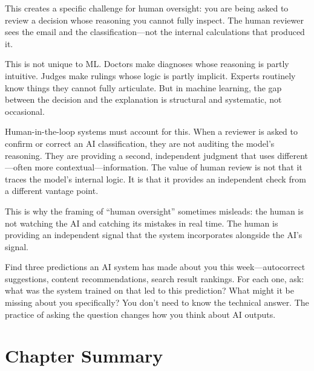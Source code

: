 This creates a specific challenge for human oversight: you are being asked to review a decision whose reasoning you cannot fully inspect. The human reviewer sees the email and the classification---not the internal calculations that produced it.

This is not unique to ML. Doctors make diagnoses whose reasoning is partly intuitive. Judges make rulings whose logic is partly implicit. Experts routinely know things they cannot fully articulate. But in machine learning, the gap between the decision and the explanation is structural and systematic, not occasional.

Human-in-the-loop systems must account for this. When a reviewer is asked to confirm or correct an AI classification, they are not auditing the model's reasoning. They are providing a second, independent judgment that uses different---often more contextual---information. The value of human review is not that it traces the model's internal logic. It is that it provides an independent check from a different vantage point.

This is why the framing of ``human oversight'' sometimes misleads: the human is not watching the AI and catching its mistakes in real time. The human is providing an independent signal that the system incorporates alongside the AI's signal.


\begin{trythis}
Find three predictions an AI system has made about you this week---autocorrect suggestions, content recommendations, search result rankings. For each one, ask: what was the system trained on that led to this prediction? What might it be missing about you specifically? You don't need to know the technical answer. The practice of asking the question changes how you think about AI outputs.
\end{trythis}

\section*{Chapter Summary}

